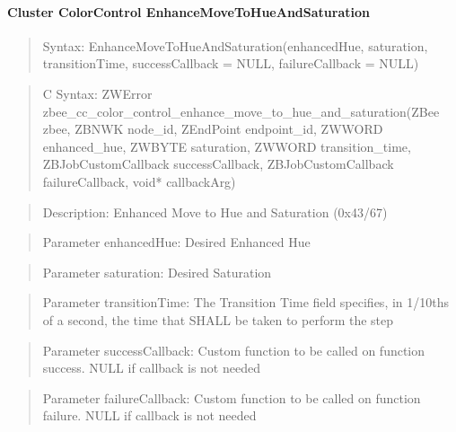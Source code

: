 \paragraph{Cluster ColorControl EnhanceMoveToHueAndSaturation}
\begin{quote}Syntax: EnhanceMoveToHueAndSaturation(enhancedHue, saturation, transitionTime, successCallback = NULL, failureCallback = NULL)\end{quote}
\begin{quote}C Syntax: ZWError zbee\_cc\_color\_control\_enhance\_move\_to\_hue\_and\_saturation(ZBee zbee, ZBNWK node\_id, ZEndPoint endpoint\_id, ZWWORD enhanced\_hue, ZWBYTE saturation, ZWWORD transition\_time, ZBJobCustomCallback successCallback, ZBJobCustomCallback failureCallback, void* callbackArg)\end{quote}
\begin{quote}Description: Enhanced Move to Hue and Saturation (0x43/67)\end{quote}
\begin{quote}Parameter enhancedHue: Desired Enhanced Hue\end{quote}
\begin{quote}Parameter saturation: Desired Saturation\end{quote}
\begin{quote}Parameter transitionTime: The Transition Time field specifies, in 1/10ths of a second, the time that SHALL be taken to perform the step\end{quote}
\begin{quote}Parameter successCallback: Custom function to be called on function success. NULL if callback is not needed\end{quote}
\begin{quote}Parameter failureCallback: Custom function to be called on function failure. NULL if callback is not needed\end{quote}


